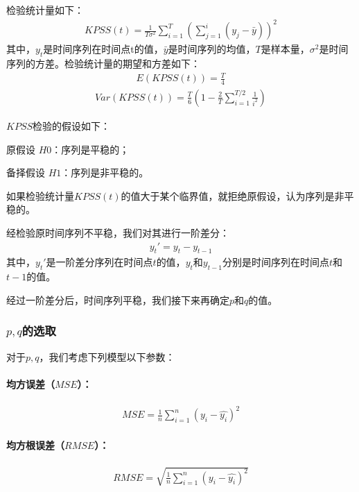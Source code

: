 \documentclass{MathorCupmodeling}
\begin{document}
检验统计量如下：
\begin{eqnarray}
KPSS(t) = \frac{1}{T \sigma^2} \sum_{i=1}^T \left(\sum_{j=1}^i (y_j - \bar{y})\right)^2
\end{eqnarray}
其中，$y_t$是时间序列在时间点t的值，$\bar{y}$是时间序列的均值，$T$是样本量，$\sigma^2$是时间序列的方差。检验统计量的期望和方差如下：
\begin{eqnarray}
E(KPSS(t)) = \frac{T}{4}
\end{eqnarray}
\begin{eqnarray}
Var(KPSS(t)) = \frac{T}{6} \left(1 - \frac{2}{T} \sum_{i=1}^{T/2} \frac{1}{i^2}\right)
\end{eqnarray}

$KPSS$检验的假设如下：

\begin{center}
原假设 $H0$：序列是平稳的；

备择假设 $H1$：序列是非平稳的。
\end{center}

如果检验统计量$KPSS(t)$的值大于某个临界值，就拒绝原假设，认为序列是非平稳的。

经检验原时间序列不平稳，我们对其进行一阶差分：
\begin{eqnarray}
y_t' = y_t - y_{t-1}
\end{eqnarray}
其中，$y_t'$是一阶差分序列在时间点$t$的值，$y_t$和$y_{t-1}$分别是时间序列在时间点$t$和$t-1$的值。

经过一阶差分后，时间序列平稳，我们接下来再确定$p$和$q$的值。
\subsubsection{$p,q$的选取}
对于$p,q$，我们考虑下列模型以下参数：

\paragraph{均方误差（$MSE$）：}
\begin{eqnarray}
MSE = \frac{1}{n}\sum_{i=1}^{n}(y_i-\hat{y_i})^2
\end{eqnarray}


\paragraph{均方根误差（$RMSE$）：}
\begin{eqnarray}
RMSE = \sqrt{\frac{1}{n}\sum_{i=1}^{n}(y_i-\hat{y_i})^2}
\end{eqnarray}
\end{document}
